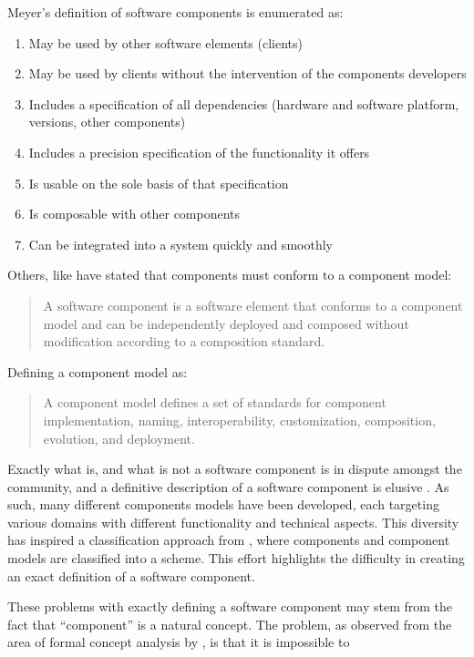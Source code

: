 Meyer's definition of software components is enumerated as:
\begin{enumerate}
  \item May be used by other software elements (clients)
  \item May be used by clients without the intervention of the components developers
  \item Includes a specification of all dependencies (hardware and software platform, versions, other components)
  \item Includes a precision specification of the functionality it offers
  \item Is usable on the sole basis of that specification
  \item Is composable with other components
  \item Can be integrated into a system quickly and smoothly
\end{enumerate}

Others, like \citep{heineman2001component} have stated that components must conform to a component model: 
\begin{quotation}
A software component is a software element that conforms to a component model and can be independently deployed and composed without modification according to a composition standard.
\end{quotation}

Defining a component model as:
\begin{quotation}
A component model defines a set of standards for component implementation, naming, interoperability, customization, composition, evolution, and deployment.
\end{quotation}

Exactly what is, and what is not a software component is in dispute amongst the community,
and a definitive description of a software component is elusive \citep{vasa2007patterns}.
As such, many different components models have been developed, each targeting various domains with different functionality and technical aspects.
This diversity has inspired a classification approach from \citep{Crnkovic2011}, where components and component models are classified into a scheme.
This effort highlights the difficulty in creating an exact definition of a software component. 

These problems with exactly defining a software component may stem from the fact that ``component'' is a natural concept.
The problem, as observed from the area of formal concept analysis \citep{Ganter1999} by \citep{Szyperski2002}, is that it is impossible to

